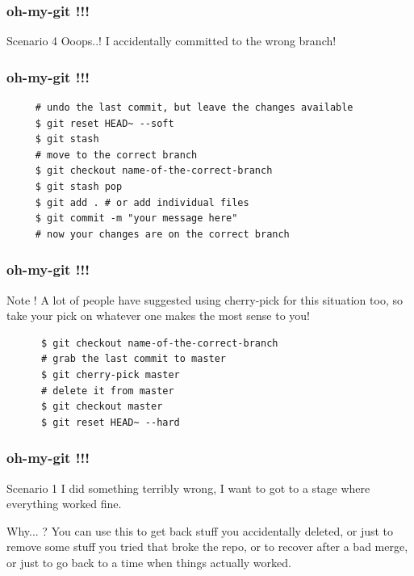 \documentclass[10pt]{beamer}
\begin{document}
\begin{frame}
  \frametitle{oh-my-git !!!}
  \begin{alertblock}{Scenario 4}
   Ooops..! I accidentally committed to the wrong branch!
  \end{alertblock}
\end{frame}

\begin{frame}[fragile]
  \frametitle{oh-my-git !!!}
  \begin{example}[Solution]
    \begin{verbatim}
     # undo the last commit, but leave the changes available
     $ git reset HEAD~ --soft
     $ git stash
     # move to the correct branch
     $ git checkout name-of-the-correct-branch
     $ git stash pop
     $ git add . # or add individual files
     $ git commit -m "your message here"
     # now your changes are on the correct branch
    \end{verbatim}
  \end{example}
\end{frame}

\begin{frame}[fragile]
  \frametitle{oh-my-git !!!}
  \begin{block}{Note !}
    A lot of people have suggested using cherry-pick for this situation too,
    so take your pick on whatever one makes the most sense to you!
  \end{block}
  \pause
  \begin{example}[Solution]
    \begin{verbatim}
      $ git checkout name-of-the-correct-branch
      # grab the last commit to master
      $ git cherry-pick master
      # delete it from master
      $ git checkout master
      $ git reset HEAD~ --hard
    \end{verbatim}
  \end{example}
\end{frame}

\begin{frame}
  \frametitle{oh-my-git !!!}
  \begin{alertblock}{Scenario 1}
    I did something terribly wrong, I want to got to a stage where everything worked fine.
  \end{alertblock}
  \pause
  \begin{block}{Why... ?}
    You can use this to get back stuff you accidentally deleted, or just to remove some stuff you
    tried that broke the repo, or to recover after a bad merge, or just to go back to a time when things actually worked.
  \end{block}
\end{frame}
\end{document}
